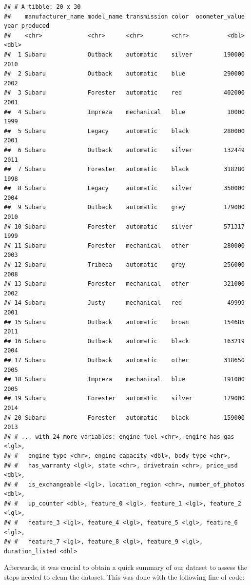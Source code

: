 \documentclass[
]{article}
\begin{document}
\begin{verbatim}
## # A tibble: 20 x 30
##    manufacturer_name model_name transmission color  odometer_value year_produced
##    <chr>             <chr>      <chr>        <chr>           <dbl>         <dbl>
##  1 Subaru            Outback    automatic    silver         190000          2010
##  2 Subaru            Outback    automatic    blue           290000          2002
##  3 Subaru            Forester   automatic    red            402000          2001
##  4 Subaru            Impreza    mechanical   blue            10000          1999
##  5 Subaru            Legacy     automatic    black          280000          2001
##  6 Subaru            Outback    automatic    silver         132449          2011
##  7 Subaru            Forester   automatic    black          318280          1998
##  8 Subaru            Legacy     automatic    silver         350000          2004
##  9 Subaru            Outback    automatic    grey           179000          2010
## 10 Subaru            Forester   automatic    silver         571317          1999
## 11 Subaru            Forester   mechanical   other          280000          2003
## 12 Subaru            Tribeca    automatic    grey           256000          2008
## 13 Subaru            Forester   mechanical   other          321000          2002
## 14 Subaru            Justy      mechanical   red             49999          2001
## 15 Subaru            Outback    automatic    brown          154685          2011
## 16 Subaru            Outback    automatic    black          163219          2004
## 17 Subaru            Outback    automatic    other          318650          2005
## 18 Subaru            Impreza    mechanical   blue           191000          2005
## 19 Subaru            Forester   automatic    silver         179000          2014
## 20 Subaru            Forester   automatic    black          159000          2013
## # ... with 24 more variables: engine_fuel <chr>, engine_has_gas <lgl>,
## #   engine_type <chr>, engine_capacity <dbl>, body_type <chr>,
## #   has_warranty <lgl>, state <chr>, drivetrain <chr>, price_usd <dbl>,
## #   is_exchangeable <lgl>, location_region <chr>, number_of_photos <dbl>,
## #   up_counter <dbl>, feature_0 <lgl>, feature_1 <lgl>, feature_2 <lgl>,
## #   feature_3 <lgl>, feature_4 <lgl>, feature_5 <lgl>, feature_6 <lgl>,
## #   feature_7 <lgl>, feature_8 <lgl>, feature_9 <lgl>, duration_listed <dbl>
\end{verbatim}

Afterwards, it was crucial to obtain a quick summary of our dataset to
assess the steps needed to clean the dataset. This was done with the
following line of code:
\end{document}
